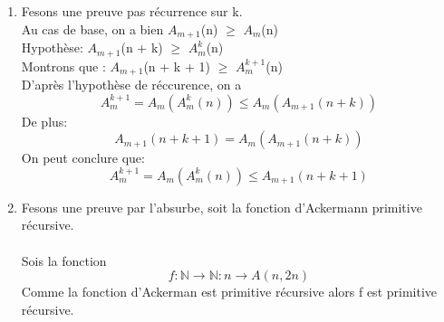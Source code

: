 \documentclass[]{article}
\begin{document}
\begin{enumerate}
\begin{enumerate}
\item Fesons une preuve pas récurrence sur k.\\
Au cas de base, on a bien $A_{m+1}$\normalsize (n) $\ge$ $A_m$\normalsize (n)\\
Hypothèse: $A_{m+1}$\normalsize (n + k) $\ge$ $A^k_m$\normalsize (n)\\
Montrons que : $A_{m+1}$(n + k + 1) $\ge$ $A^{k+1}_m$(n)\\
D'après l'hypothèse de réccurence, on a \\
\[A^{k+1}_m = A_m(A^k_m(n)) \le A_m(A_{m+1}(n + k))\] 
De plus:\\
\[A_{m+1}(n + k + 1) = A_m(A_{m+1}(n + k))\]
On peut conclure que:\\
\[A^{k+1}_m = A_m(A^k_m(n)) \le A_{m+1}(n + k + 1)\]
\item 
Fesons une preuve par l'absurbe, soit la fonction d'Ackermann primitive récursive.\\\\
Sois la fonction \[f: \mathbb{N} \rightarrow \mathbb{N} : n \rightarrow A(n,2n)\]
Comme la fonction d'Ackerman est primitive récursive alors f est primitive récursive.   
\end{enumerate}
\end{enumerate}
\end{document}
